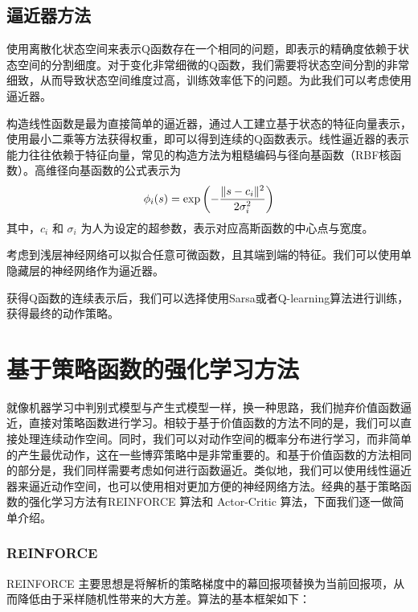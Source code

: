 \documentclass[conference,10pt]{IEEEtran}
\begin{document}
\subsection{逼近器方法}
使用离散化状态空间来表示Q函数存在一个相同的问题，即表示的精确度依赖于状态空间的分割细度。对于变化非常细微的Q函数，我们需要将状态空间分割的非常细致，从而导致状态空间维度过高，训练效率低下的问题。为此我们可以考虑使用逼近器。

构造线性函数是最为直接简单的逼近器，通过人工建立基于状态的特征向量表示，使用最小二乘等方法获得权重，即可以得到连续的Q函数表示。线性逼近器的表示能力往往依赖于特征向量，常见的构造方法为粗糙编码与径向基函数（RBF核函数）。高维径向基函数的公式表示为
\begin{equation}
	\phi_i(s) = \exp\large\left(-\dfrac{\Vert s-c_i\Vert^2}{2\sigma_i^2}\large\right)
\end{equation}
其中，$c_i$ 和 $\sigma_i$ 为人为设定的超参数，表示对应高斯函数的中心点与宽度。

考虑到浅层神经网络可以拟合任意可微函数，且其端到端的特征。我们可以使用单隐藏层的神经网络作为逼近器。

获得Q函数的连续表示后，我们可以选择使用Sarsa或者Q-learning算法进行训练，获得最终的动作策略。
\section{基于策略函数的强化学习方法}
就像机器学习中判别式模型与产生式模型一样，换一种思路，我们抛弃价值函数逼近，直接对策略函数进行学习。相较于基于价值函数的方法不同的是，我们可以直接处理连续动作空间。同时，我们可以对动作空间的概率分布进行学习，而非简单的产生最优动作，这在一些博弈策略中是非常重要的。和基于价值函数的方法相同的部分是，我们同样需要考虑如何进行函数逼近。类似地，我们可以使用线性逼近器来逼近动作空间，也可以使用相对更加方便的神经网络方法。经典的基于策略函数的强化学习方法有REINFORCE 算法和 Actor-Critic 算法，下面我们逐一做简单介绍。
\subsubsection{REINFORCE}
REINFORCE 主要思想是将解析的策略梯度中的幕回报项替换为当前回报项，从而降低由于采样随机性带来的大方差。算法的基本框架如下：
\end{document}
